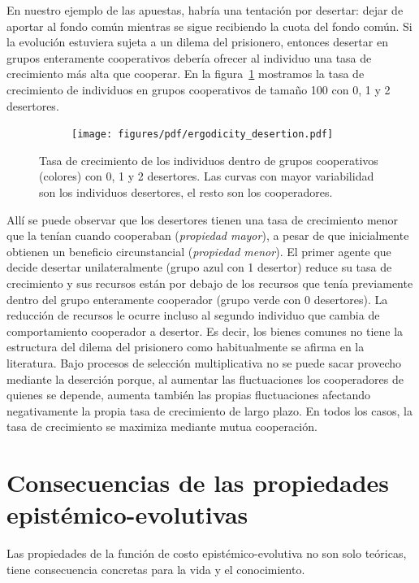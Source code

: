 \documentclass[a4paper,11pt]{book}
\theoremstyle{definition}
\begin{document}
En nuestro ejemplo de las apuestas, habría una tentación por desertar: dejar de aportar al fondo común mientras se sigue recibiendo la cuota del fondo común.
%
Si la evolución estuviera sujeta a un dilema del prisionero, entonces desertar en grupos enteramente cooperativos debería ofrecer al individuo una tasa de crecimiento más alta que cooperar.
%
En la figura~\ref{fig:desert} mostramos la tasa de crecimiento de individuos en grupos cooperativos de tamaño 100 con 0, 1 y 2 desertores.
%
\begin{figure}[ht!]
\centering
 \begin{subfigure}[c]{0.45\textwidth} \centering
  \texttt{[image: figures/pdf/ergodicity\_desertion.pdf]}
  \end{subfigure}
 \caption{
Tasa de crecimiento de los individuos dentro de grupos cooperativos (colores) con 0, 1 y 2 desertores. Las curvas con mayor variabilidad son los individuos desertores, el resto son los cooperadores.}
 \label{fig:desert}
 \end{figure}
Allí se puede observar que los desertores tienen una tasa de crecimiento menor que la tenían cuando cooperaban (\emph{propiedad mayor}), a pesar de que inicialmente obtienen un beneficio circunstancial (\emph{propiedad menor}).
%
El primer agente que decide desertar unilateralmente (grupo azul con 1 desertor) reduce su tasa de crecimiento y sus recursos están por debajo de los recursos que tenía previamente dentro del grupo enteramente cooperador (grupo verde con 0 desertores).
%
La reducción de recursos le ocurre incluso al segundo individuo que cambia de comportamiento cooperador a desertor.
%
Es decir, los bienes comunes no tiene la estructura del dilema del prisionero como habitualmente se afirma en la literatura.
%
Bajo procesos de selección multiplicativa no se puede sacar provecho mediante la deserción porque, al aumentar las fluctuaciones los cooperadores de quienes se depende, aumenta también las propias fluctuaciones afectando negativamente la propia tasa de crecimiento de largo plazo.
%
En todos los casos, la tasa de crecimiento se maximiza mediante mutua cooperación.


\section{Consecuencias de las propiedades epistémico-evolutivas}

Las propiedades de la función de costo epistémico-evolutiva no son solo teóricas, tiene consecuencia concretas para la vida y el conocimiento.
\end{document}
